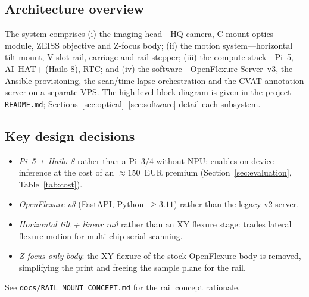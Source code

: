 \subsection{Architecture overview}
The system comprises (i) the imaging head---HQ camera, C-mount optics module,
ZEISS objective and Z-focus body; (ii) the motion system---horizontal tilt
mount, V-slot rail, carriage and rail stepper; (iii) the compute stack---Pi~5,
AI~HAT+ (Hailo-8), RTC; and (iv) the software---OpenFlexure Server~v3, the
Ansible provisioning, the scan/time-lapse orchestration and the CVAT annotation
server on a separate VPS. The high-level block diagram is given in the project
\texttt{README.md}; Sections~\ref{sec:optical}--\ref{sec:software} detail each
subsystem.

\subsection{Key design decisions}
\begin{itemize}
\item \emph{Pi~5 + Hailo-8} rather than a Pi~3/4 without NPU: enables on-device
  inference at the cost of an $\approx\num{150}$~EUR premium
  (Section~\ref{sec:evaluation}, Table~\ref{tab:cost}).
\item \emph{OpenFlexure v3} (FastAPI, Python~$\geq 3.11$) rather than the legacy
  v2 server.
\item \emph{Horizontal tilt + linear rail} rather than an XY flexure stage:
  trades lateral flexure motion for multi-chip serial scanning.
\item \emph{Z-focus-only body}: the XY flexure of the stock OpenFlexure body is
  removed, simplifying the print and freeing the sample plane for the rail.
\end{itemize}
See \texttt{docs/RAIL\_MOUNT\_CONCEPT.md} for the rail concept rationale.
